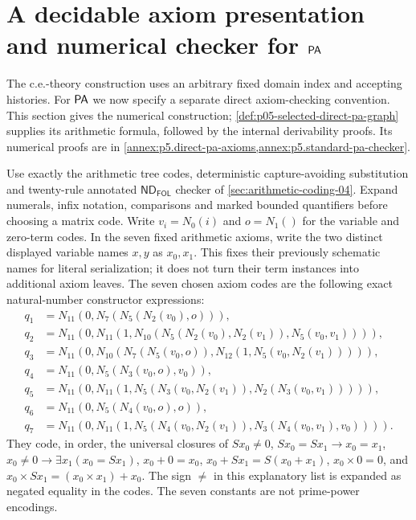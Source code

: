 \section{A decidable axiom presentation and numerical checker for \(\mathsf{PA}\)}
\label{sec:p05-standard-pa-checker}

The c.e.-theory construction uses an arbitrary fixed domain index and
accepting histories.  For \(\mathsf{PA}\) we now specify a separate direct
axiom-checking convention. This section gives the numerical construction;
\cref{def:p05-selected-direct-pa-graph} supplies its arithmetic formula,
followed by the internal derivability proofs. Its numerical proofs are in
\cref{annex:p5.direct-pa-axioms,annex:p5.standard-pa-checker}.

Use exactly the arithmetic tree codes, deterministic capture-avoiding
substitution and twenty-rule annotated \(\mathsf{ND}_{\mathsf{FOL}}\) checker of
\cref{sec:arithmetic-coding-04}.  Expand numerals, infix notation,
comparisons and marked bounded quantifiers before choosing a matrix code.
Write \(v_i=N_0(i)\) and \(o=N_1()\)
for the variable and zero-term codes.  In the seven fixed arithmetic axioms,
write the two distinct displayed variable names \(x,y\) as \(x_0,x_1\).
This fixes their previously schematic names for literal serialization;
it does not turn their term instances into additional axiom leaves.
The seven chosen axiom codes are the following exact natural-number
constructor expressions:
\[
\begin{aligned}
 q_1&=N_{11}(0,N_7(N_5(N_2(v_0),o))),\\
 q_2&=N_{11}(0,N_{11}(1,
       N_{10}(N_5(N_2(v_0),N_2(v_1)),N_5(v_0,v_1)))),\\
 q_3&=N_{11}(0,N_{10}(N_7(N_5(v_0,o)),
                         N_{12}(1,N_5(v_0,N_2(v_1))))),\\
 q_4&=N_{11}(0,N_5(N_3(v_0,o),v_0)),\\
 q_5&=N_{11}(0,N_{11}(1,
       N_5(N_3(v_0,N_2(v_1)),N_2(N_3(v_0,v_1))))),\\
 q_6&=N_{11}(0,N_5(N_4(v_0,o),o)),\\
 q_7&=N_{11}(0,N_{11}(1,
       N_5(N_4(v_0,N_2(v_1)),N_3(N_4(v_0,v_1),v_0)))).
\end{aligned}
\]
They code, in order, the universal closures of
\(Sx_0\ne0\), \(Sx_0=Sx_1\to x_0=x_1\),
\(x_0\ne0\to\exists x_1(x_0=Sx_1)\), \(x_0+0=x_0\),
\(x_0+Sx_1=S(x_0+x_1)\), \(x_0\times0=0\), and
\(x_0\times Sx_1=(x_0\times x_1)+x_0\).
The sign \(\ne\) in this explanatory list is expanded as negated equality
in the codes.  The seven constants are not prime-power encodings.

